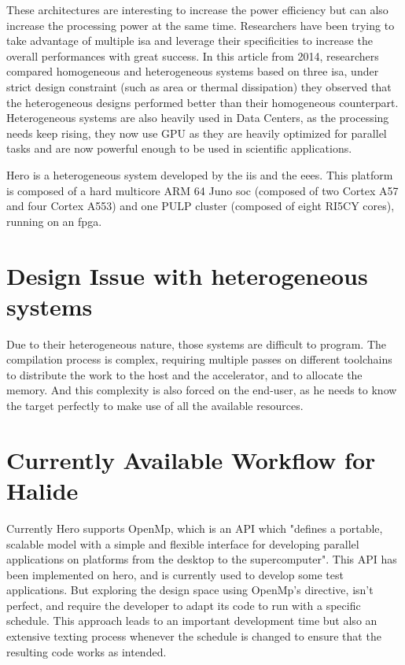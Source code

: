 	These architectures are interesting to increase the power efficiency but can also increase the processing power at the same time. Researchers have been trying to take advantage of multiple \acrshort{isa} and leverage their specificities to increase the overall performances with great success. In this article \cite{Art:Harnessing} from 2014, researchers compared homogeneous and heterogeneous systems based on three \acrshort{isa}, under strict design constraint (such as area or thermal dissipation) they observed that the heterogeneous designs performed better than their homogeneous counterpart. Heterogeneous systems are also heavily used in Data Centers, as the processing needs keep rising, they now use GPU as they are heavily optimized for parallel tasks and are now powerful enough to be used in scientific applications.

    Hero \cite{Web:Hero} is a heterogeneous system developed by the \acrfull{iis} and the \acrfull{eees}. This platform is composed of a hard multicore ARM 64 Juno \acrshort{soc} (composed of two Cortex A57 and four Cortex A553) and one PULP cluster (composed of eight RI5CY cores), running on an \acrshort{fpga}.

\section {Design Issue with heterogeneous systems}
	Due to their heterogeneous nature, those systems are difficult to program. The compilation process is complex, requiring multiple passes on different toolchains to distribute the work to the host and the accelerator, and to allocate the memory. And this complexity is also forced on the end-user, as he needs to know the target perfectly to make use of all the available resources.

\section { Currently Available Workflow for Halide}
	Currently Hero supports OpenMp, which is an API which "defines a portable, scalable model with a simple and flexible interface for developing parallel applications on platforms from the desktop to the supercomputer"\cite{Web:OpenMp}. This API has been implemented on hero, and is currently used to develop some test applications.
    But exploring the design space using OpenMp's directive, isn't perfect, and require the developer to adapt its code to run with a specific schedule. This approach leads to an important development time but also an extensive texting process whenever the schedule is changed to ensure that the resulting code works as intended.


